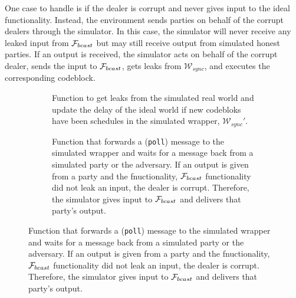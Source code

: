 One case to handle is if the dealer is corrupt and never gives input to the ideal functionality.
Instead, the environment sends parties on behalf of the corrupt dealers through the simulator.
In this case, the simulator will never receive any leaked input from $\mathcal{F}_{bcast}$ but may still receive output from simulated honest parties.
If an output is received, the simulator acts on behalf of the corrupt dealer, sends the input to $\mathcal{F}_{bcast}$, gets leaks from $\mathcal{W}_{sync}$, and executes the corresponding codeblock.

\begin{figure}
	
	\label{fig:sim:bracha_ours}
\end{figure}

\begin{figure}
	\begin{subfigure}{\textwidth}
	
	\label{fig:algo:simgetleaks}
	\caption{Function to get leaks from the simulated real world and update the delay of the ideal world if new codebloks have been schedules in the simulated wrapper, $\mathcal{W}_{sync}'$.}
	\end{subfigure}
	\newline
	\begin{subfigure}{\textwidth}
	
	\label{fig:algo:poll}
	\caption{Function that forwards a (\texttt{poll}) message to the simulated wrapper and waits for a message back from a simulated party or the adversary. If an output is given from a party and the fnuctionality, $\mathcal{F}_{bcast}$ functionality did not leak an input, the dealer is corrupt. Therefore, the simulator gives input to $\mathcal{F}_{bcast}$ and delivers that party's output.}
	\end{subfigure}
\end{figure}
